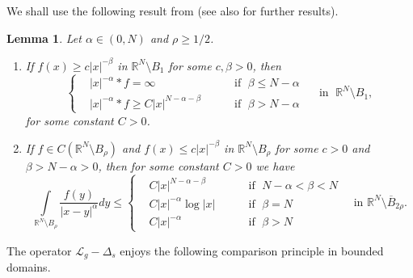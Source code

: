 \documentclass[leqno,12pt]{article}
\numberwithin{equation}{section}
\newcommand{\R}{\mathbb R}
\newcommand{\Lg}{{\mathcal L}_g}
\newtheorem{lemma}[theorem]{Lemma}
\begin{document}
We shall use the following result from \cite[Lemma 3.7]{GKS20} (see also \cite{Gbook22, GT16book} for further results).
\begin{lemma}\label{lbas}
Let $\alpha\in (0,N)$ and $\rho\geq  1/2$.

\begin{enumerate}
\item[\rm (i)]
If $f(x)\geq c|x|^{-\beta}$ in $\R^N\setminus B_{1}$ for some $c,\beta>0$, then
$$ \left\{
\begin{aligned}
&  |x|^{-\alpha}*f=\infty && \quad\mbox{ if } \; \beta \leq N-\alpha \\
&  |x|^{-\alpha}*f\geq C|x|^{N-\alpha-\beta} && \quad\mbox{ if } \; \beta> N-\alpha
\end{aligned}
\right. \quad\mbox{ in }\; \R^N\setminus B_{1},
$$
for some constant $C>0$.

\item[\rm (ii)]
If $f\in C(\R^N\setminus B_\rho)$ and $\displaystyle f(x)\leq  c|x|^{-\beta}$ in $\R^N\setminus B_{\rho}$ for some $c>0$ and $\beta>N-\alpha>0$, then for some constant $C>0$ we have
$$ 
\int\limits_{\R^N\setminus B_{\rho}}\frac{f(y)}{|x-y|^{\alpha}} dy \leq 
\left\{
\begin{aligned}
&C |x|^{N-\alpha-\beta} &&\quad\mbox{ if }\; N-\alpha<\beta<N\\
&C|x|^{-\alpha}\log|x|   &&\quad\mbox{ if }\; \beta=N\\
&C|x|^{-\alpha} &&\quad\mbox{ if }\; \beta>N
\end{aligned}
\right.
\quad\mbox{in }\R^N\setminus \overline B_{2\rho}.
$$
\end{enumerate}
\end{lemma}

The operator $\Lg-\Delta_s$ enjoys the following comparison principle in bounded domains.
\end{document}
